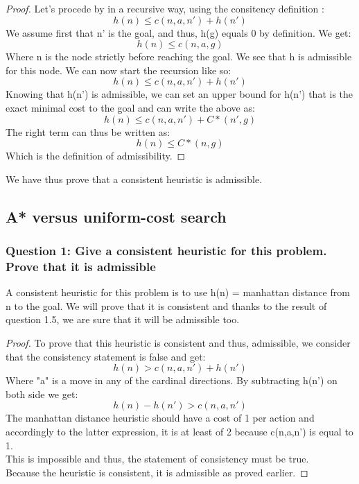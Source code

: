 \documentclass[a4paper,10pt]{article}
\begin{document}
				\begin{proof}
					Let's procede by in a recursive way, using the consitency definition :						$$ h(n) \leq c(n,a,n') + h(n') $$
					We assume first that n' is the goal, and thus, h(g) equals 0 by definition. We get:
					$$ h(n) \leq c(n,a,g) $$
					Where n is the node strictly before reaching the goal. We see that h is admissible for this node. We can now start the recursion like so:
					$$ h(n) \leq c(n,a,n') + h(n') $$
					Knowing that h(n') is admissible, we can set an upper bound for h(n') that is the exact minimal cost to the goal and can write the above as:
					$$ h(n) \leq c(n,a,n') + C*(n', g) $$
					The right term can thus be written as:
					$$ h(n) \leq C*(n, g) $$
					Which is the definition of admissibility.        
				\end{proof}
				We have thus prove that a consistent heuristic is admissible.
				
		\subsection{A* versus uniform-cost search}
			\subsubsection{Question 1: Give a consistent heuristic for this problem. Prove that it is admissible}
				A consistent heuristic for this problem is to use h(n) = manhattan distance from n to the goal. We will prove that it is consistent and thanks to the result of question 1.5, we are sure that it will be admissible too.
				\begin{proof}
					To prove that this heuristic is consistent and thus, admissible, we consider that the consistency statement is false and get:
					$$ h(n) > c(n,a,n') + h(n') $$
					Where "a" is a move in any of the cardinal directions.
					By subtracting h(n') on both side we get:
					$$ h(n) - h(n') > c(n,a,n') $$
					The manhattan distance heuristic should have a cost of 1 per action and accordingly to the latter expression, it is at least of 2 because c(n,a,n') is equal to 1.\\
					This is impossible and thus, the statement of consistency must be true.\\
					Because the heuristic is consistent, it is admissible as proved earlier.   
				\end{proof}  				
				
\end{document}
